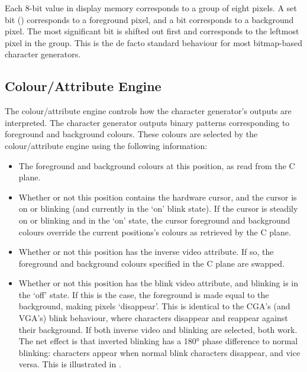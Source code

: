 Each 8-bit value in display memory corresponds to a group of eight pixels. A
set bit () corresponds to a foreground pixel, and a  bit
corresponds to a background pixel. The most significant bit is shifted out
first and corresponds to the leftmost pixel in the group. This is the de facto
standard behaviour for most bitmap-based character generators.




\subsection{Colour/Attribute Engine}
\label{sec:vdu:colour-engine}

The colour/attribute engine controls how the character generator's outputs are
interpreted. The character generator outputs binary patterns corresponding to
foreground and background colours. These colours are selected by the
colour/attribute engine using the following information:

\begin{itemize}
  \item The foreground and background colours at this position, as read from the
  C plane.

  \item Whether or not this position contains the hardware cursor, and
  the cursor is on or blinking (and currently in the ‘on’ blink state). If the
  cursor is steadily on or blinking and in the ‘on’ state, the cursor
  foreground and background colours override the current positions's colours as
  retrieved by the C plane.

  \item Whether or not this position has the inverse video attribute. If so, the
  foreground and background colours specified in the C plane are swapped.

  \item Whether or not this position has the blink video attribute, and blinking
  is in the ‘off’ state. If this is the case, the foreground is made equal to
  the background, making pixels ‘disappear’. This is identical to the CGA's
  (and VGA's) blink behaviour, where characters disappear and reappear against
  their background. If both inverse video and blinking are selected, both
  work. The net effect is that inverted blinking has a 180° phase difference to
  normal blinking: characters appear when normal blink characters disappear,
  and vice versa. This is illustrated in .
\end{itemize}


